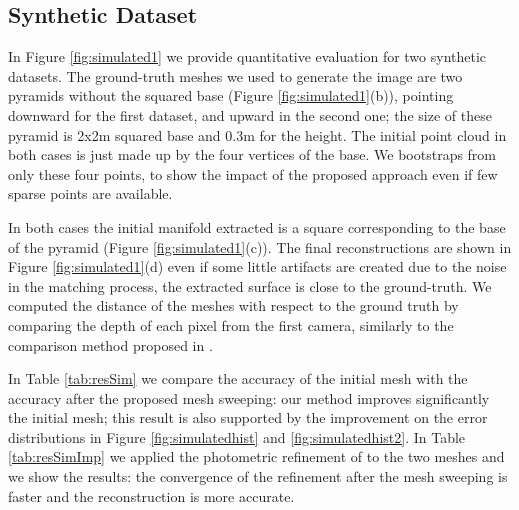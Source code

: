 \subsection{Synthetic Dataset}
In Figure \ref{fig:simulated1} we provide quantitative evaluation for two synthetic datasets.
The ground-truth meshes we used to generate the image are two pyramids without the squared base (Figure \ref{fig:simulated1}(b)), pointing downward for the first dataset, and upward in the second one; the size of these pyramid is 2x2m squared base and 0.3m for the height.
The initial point cloud in both cases is just made up by the four vertices of the base. 
We bootstraps from only these four points, to show the impact of the proposed approach even if few sparse points are available.

In both cases the initial manifold extracted is a square corresponding to the base of the pyramid (Figure \ref{fig:simulated1}(c)).
The final reconstructions are shown in Figure \ref{fig:simulated1}(d) even if some little artifacts are created due to the noise in the matching process, the extracted surface is close to the ground-truth.
We computed the distance of the meshes with respect to the ground truth by comparing the depth of each pixel from the first camera, similarly to the comparison method proposed in \cite{strecha2008}. 

In Table \ref{tab:resSim} we compare the accuracy of the initial mesh with the accuracy after the proposed mesh sweeping: our method improves significantly the initial mesh; this result is also supported by the improvement on the error distributions in  Figure \ref{fig:simulatedhist} and \ref{fig:simulatedhist2}.
In Table \ref{tab:resSimImp} we applied the photometric refinement of \cite{vu_et_al_2012} to the two meshes and we show the results: the convergence of the refinement after the mesh sweeping is faster and the reconstruction is more accurate.


